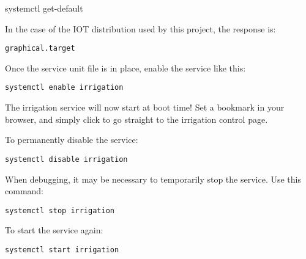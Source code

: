 systemctl get-default

In the case of the IOT distribution used by this project, the response is:

\begin{verbatim}
graphical.target
\end{verbatim}

Once the service unit file is in place, enable the service like this:

\begin{verbatim}
systemctl enable irrigation
\end{verbatim}

The irrigation service will now start at boot time!  Set a bookmark in your 
browser, and simply click to go straight to the irrigation control page.

To permanently disable the service:

\begin{verbatim}
systemctl disable irrigation
\end{verbatim}

When debugging, it may be necessary to temporarily stop the service.  Use this 
command:

\begin{verbatim}
systemctl stop irrigation
\end{verbatim}

To start the service again:

\begin{verbatim}
systemctl start irrigation
\end{verbatim}



